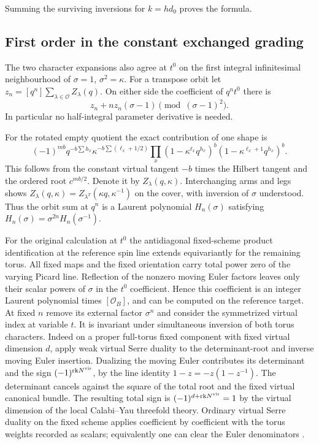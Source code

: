 Summing the surviving inversions for $k=hd_0$ proves the formula.

\subsection{First order in the constant exchanged grading}

The two character expansions also agree at $t^0$ on the first integral infinitesimal neighbourhood of $\sigma=1$, $\sigma^2=\kappa$. For a transpose orbit let $z_n=[q^n]\sum_{\lambda\in\mathcal O}Z_\lambda(q)$. On either side the coefficient of $q^nt^0$ there is
\[
z_n+nz_n(\sigma-1)\pmod{(\sigma-1)^2}.
\]
In particular no half-integral parameter derivative is needed.

For the rotated empty quotient the exact contribution of one shape is
\[
(-1)^{mb}q^{-b\sum h_x}\kappa^{-b\sum(\ell_x+1/2)}
\prod_x(1-\kappa^{\ell_x}q^{h_x})^b(1-\kappa^{\ell_x+1}q^{h_x})^b .
\]
This follows from the constant virtual tangent $-b$ times the Hilbert tangent and the ordered root $c^{mb/2}$. Denote it by $Z_\lambda(q,\kappa)$. Interchanging arms and legs shows $Z_\lambda(q,\kappa)=Z_{\lambda^T}(\kappa q,\kappa^{-1})$ on the cover, with inversion of $\sigma$ understood. Thus the orbit sum at $q^n$ is a Laurent polynomial $H_n(\sigma)$ satisfying $H_n(\sigma)=\sigma^{2n}H_n(\sigma^{-1})$.

For the original calculation at $t^0$ the antidiagonal fixed-scheme product identification at the reference spin line extends equivariantly for the remaining torus. All fixed maps and the fixed orientation carry total power zero of the varying Picard line. Reflection of the nonzero moving Euler factors leaves only their scalar powers of $\sigma$ in the $t^0$ coefficient. Hence this coefficient is an integer Laurent polynomial times $[\mathcal O_B]$, and can be computed on the reference target. At fixed $n$ remove its external factor $\sigma^n$ and consider the symmetrized virtual index at variable $t$. It is invariant under simultaneous inversion of both torus characters. Indeed on a proper full-torus fixed component with fixed virtual dimension $d$, apply weak virtual Serre duality to the determinant-root and inverse moving Euler insertion. Dualizing the moving Euler contributes its determinant and the sign $(-1)^{\mathrm{rk}N^{\rm vir}}$, by the line identity $1-z=-z(1-z^{-1})$. The determinant cancels against the square of the total root and the fixed virtual canonical bundle. The resulting total sign is $(-1)^{d+\mathrm{rk}N^{\rm vir}}=1$ by the virtual dimension of the local Calabi--Yau threefold theory. Ordinary virtual Serre duality on the fixed scheme applies coefficient by coefficient with the torus weights recorded as scalars; equivalently one can clear the Euler denominators \cite[Proposition~3.10]{FG}.

